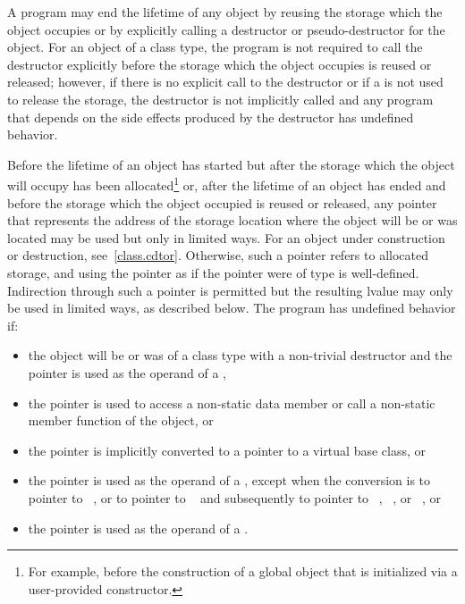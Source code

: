 \pnum
A program may end the lifetime of any object by reusing the storage
which the object occupies or by explicitly calling a destructor
or pseudo-destructor for the object.
For an object of a class type, the program is not required to
call the destructor explicitly before the storage which the object
occupies is reused or released; however, if there is no explicit call to
the destructor or if a 
is not used to release the storage, the destructor is not
implicitly called and any program that depends on the side effects
produced by the destructor has undefined behavior.

\pnum
Before the lifetime of an object has started but after the storage which
the object will occupy has been allocated\footnote{For example, before the
construction of a global object
that is initialized via a user-provided constructor.}
or, after the lifetime of an object has ended and before the storage
which the object occupied is reused or released, any pointer that represents the address of
the storage location where the object will be or was located may be
used but only in limited ways.
For an object under construction or destruction, see~\ref{class.cdtor}.
Otherwise, such
a pointer refers to allocated
storage, and using the pointer as
if the pointer were of type  is
well-defined. Indirection through such a pointer is permitted but the resulting lvalue may only be used in
limited ways, as described below. The
program has undefined behavior if:
\begin{itemize}
\item
  the object will be or was of a class type with a non-trivial destructor
  and the pointer is used as the operand of a ,
\item
  the pointer is used to access a non-static data member or call a
  non-static member function of the object, or
\item
  the pointer is implicitly converted to a pointer
  to a virtual base class, or
\item
  the pointer is used as the operand of a
  , except when the conversion
  is to pointer to \cv{}~, or to pointer to \cv{}~
  and subsequently to pointer to
  \cv{}~,
  \cv{}~, or
  \cv{}~, or
\item
  the pointer is used as the operand of a
  .
\end{itemize}

